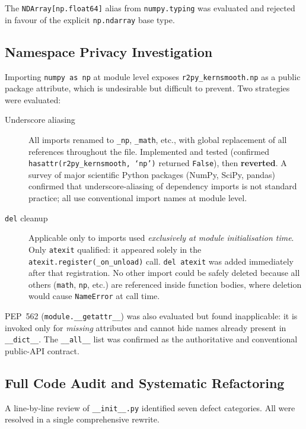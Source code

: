 \documentclass[12pt,a4paper]{article}
\begin{document}
The \texttt{NDArray[np.float64]} alias from \texttt{numpy.typing} was evaluated and rejected in favour of the explicit \texttt{np.ndarray} base type.

\subsection{Namespace Privacy Investigation}

Importing \texttt{numpy as np} at module level exposes \texttt{r2py\_kernsmooth.np} as a public package attribute, which is undesirable but difficult to prevent. Two strategies were evaluated:

\begin{description}
  \item[Underscore aliasing] All imports renamed to \texttt{\_np}, \texttt{\_math}, etc., with global replacement of all references throughout the file. Implemented and tested (confirmed \texttt{hasattr(r2py\_kernsmooth, `np')} returned \texttt{False}), then \textbf{reverted}. A survey of major scientific Python packages (NumPy, SciPy, pandas) confirmed that underscore-aliasing of dependency imports is not standard practice; all use conventional import names at module level.
  \item[\texttt{del} cleanup] Applicable only to imports used \emph{exclusively at module initialisation time}. Only \texttt{atexit} qualified: it appeared solely in the \texttt{atexit.register(\_on\_unload)} call. \texttt{del atexit} was added immediately after that registration. No other import could be safely deleted because all others (\texttt{math}, \texttt{np}, etc.) are referenced inside function bodies, where deletion would cause \texttt{NameError} at call time.
\end{description}

PEP~562 (\texttt{module.\_\_getattr\_\_}) was also evaluated but found inapplicable: it is invoked only for \emph{missing} attributes and cannot hide names already present in \texttt{\_\_dict\_\_}. The \texttt{\_\_all\_\_} list was confirmed as the authoritative and conventional public-API contract.

\subsection{Full Code Audit and Systematic Refactoring}

A line-by-line review of \texttt{\_\_init\_\_.py} identified seven defect categories. All were resolved in a single comprehensive rewrite.
\end{document}
